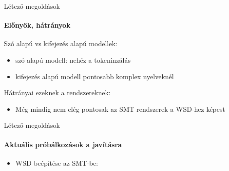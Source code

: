 \begin{frame}{Létező megoldások}
	\framesubtitle{Előnyök, hátrányok}
	
	Szó alapú vs kifejezés alapú modellek: 
	\begin{itemize}
		\item
			szó alapú modell: nehéz a tokeninzálás \cite{Lopez07asurvey}
		\item
			kifejezés alapú modell pontosabb komplex nyelveknél \cite{Lopez07asurvey}
		
	\end{itemize}
	
	Hátrányai ezeknek a rendszereknek:
	\begin{itemize}
		\item
			Még mindig nem elég pontosak az SMT rendszerek a WSD-hez képest \cite{Carpuat_evaluatingthe}
	\end{itemize}
	
\end{frame}


\begin{frame}{Létező megoldások}
	\framesubtitle{Aktuális próbálkozások a javításra}
	
	\begin{itemize}
		\item
			WSD beépítése az SMT-be: \cite{carpuat2005} \cite{Carpuat07improvingstatistical}
	\end{itemize}
\end{frame}


